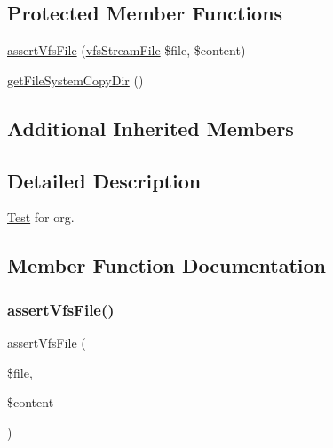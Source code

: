\subsection*{Protected Member Functions}
\begin{DoxyCompactItemize}
\item 
\mbox{\hyperlink{classorg_1_1bovigo_1_1vfs_1_1vfs_stream_test_case_ab08f44ca1eff091c3fbad58581ccc7a5}{assert\+Vfs\+File}} (\mbox{\hyperlink{classorg_1_1bovigo_1_1vfs_1_1vfs_stream_file}{vfs\+Stream\+File}} \$file, \$content)
\item 
\mbox{\hyperlink{classorg_1_1bovigo_1_1vfs_1_1vfs_stream_test_case_ac680b4e53022a76b5c5c5169096e3159}{get\+File\+System\+Copy\+Dir}} ()
\end{DoxyCompactItemize}
\subsection*{Additional Inherited Members}


\subsection{Detailed Description}
\mbox{\hyperlink{class_test}{Test}} for org. 

\subsection{Member Function Documentation}
\mbox{\label{classorg_1_1bovigo_1_1vfs_1_1vfs_stream_test_case_ab08f44ca1eff091c3fbad58581ccc7a5}} 
\subsubsection{\texorpdfstring{assert\+Vfs\+File()}{assertVfsFile()}}
{\footnotesize\ttfamily assert\+Vfs\+File (\begin{DoxyParamCaption}\item[{\mbox{\hyperlink{classorg_1_1bovigo_1_1vfs_1_1vfs_stream_file}{vfs\+Stream\+File}}}]{\$file,  }\item[{}]{\$content }\end{DoxyParamCaption})\hspace{0.3cm}{\ttfamily [protected]}}

